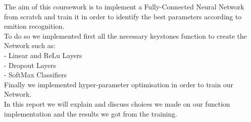 The aim of this coursework is to implement a Fully-Connected Neural Network from scratch and train it in order to identify the best parameters according to emition recognition. \\

To do so we implemented first all the necessary keystones function to create the Network such as: \\
	- Linear and ReLu Layers \\
	- Dropout Layers \\
	- SoftMax Classifiers \\

Finally we implemented hyper-parameter optimisation in order to train our Network.\\
In this report we will explain and discuss choices we made on our function implementation and the results we got from the training.

